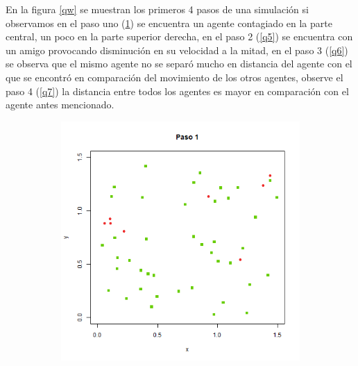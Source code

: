 \documentclass[a4paper]{article}
\begin{document}
\justify En la figura \ref{qw} se muestran los primeros 4 pasos de una simulación si observamos en el paso uno (\ref{q4}) se encuentra un agente contagiado en la parte central, un poco en la parte superior derecha, en el paso 2 (\ref{q5}) se encuentra con un amigo provocando disminución en su velocidad a la mitad, en el paso 3 (\ref{q6}) se observa que el mismo agente no se separó mucho en distancia del agente con el que se encontró en comparación del movimiento de los otros agentes, observe el paso 4 (\ref{q7}) la distancia entre todos los agentes es mayor en comparación con el agente antes mencionado.
\bigskip
\begin{figure}[h!]
    \centering
\begin{subfigure}[b]{0.45\linewidth}
\includegraphics[width=\linewidth]{reto2,1.png}
\caption{}
\label{q4}
\end{subfigure}
\begin{subfigure}[b]{0.45\linewidth}

\end{subfigure}
\end{figure}
\end{document}
